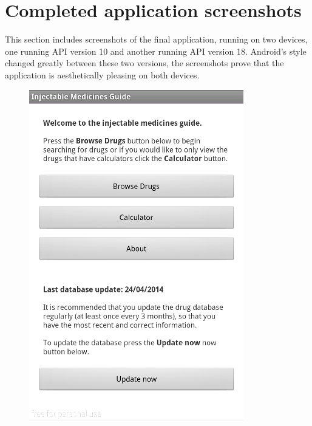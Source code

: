 \section{Completed application screenshots}
This section includes screenshots of the final application, running on two devices, one running API version 10 and another running API version 18.  Android's style changed greatly between these two versions, the screenshots prove that the application is aesthetically pleasing on both devices.

\begin{figure}[H]
\centering
\begin{minipage}{.5\textwidth}
  \centering
  \includegraphics[width=.8\linewidth]{Images/screenshots/API10/main.png}
\end{minipage}%
\begin{minipage}{.5\textwidth}
  \centering

\end{minipage}
\end{figure}
